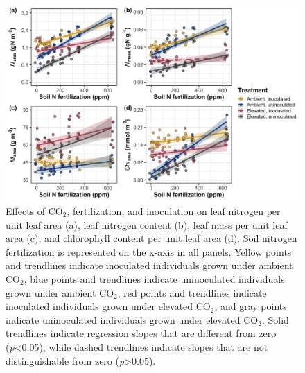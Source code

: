 \newpage
\begin{landscape}
    \begin{figure}
        \centering
        \includegraphics[width=\columnwidth]{ch5_NxCO2xI/figs/NxCO2xI_fig1_leafN.jpg}
        \caption[Effects of CO$_2$, fertilization, and inoculation on leaf nitrogen per unit leaf area, leaf nitrogen content, leaf mass per unit leaf area, and chlorophyll content per unit leaf area]{Effects of CO$_2$, fertilization, and inoculation on leaf nitrogen per unit leaf area (a), leaf nitrogen content (b), leaf mass per unit leaf area (c), and chlorophyll content per unit leaf area (d). Soil nitrogen fertilization is represented on the x-axis in all panels. Yellow points and trendlines indicate inoculated individuals grown under ambient CO$_2$, blue points and trendlines indicate uninoculated individuals grown under ambient CO$_2$, red points and trendlines indicate inoculated individuals grown under elevated CO$_2$, and gray points indicate uninoculated individuals grown under elevated CO$_2$. Solid trendlines indicate regression slopes that are different from zero (\textit{p}<0.05), while dashed trendlines indicate slopes that are not distinguishable from zero (\textit{p}>0.05).}
        \label{fig:figure5.1}
    \end{figure}
\end{landscape}
\clearpage

